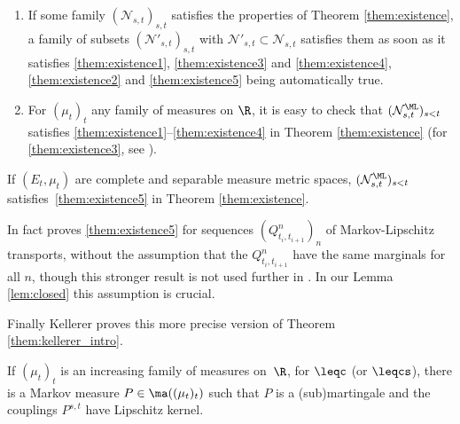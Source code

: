 \skpt
\begin{rem}\label{rem:otherNs}
\begin{enumerate}
\item\label{rem:otherNsa}
\label{item:rem:otherNsA} If some family $(\mathcal{N}_{s,t})_{s,t}$ satisfies the properties of Theorem \ref{them:existence}, a family of subsets $(\mathcal{N}'_{s,t})_{s,t}$ with $\mathcal{N}'_{s,t}\subset \mathcal{N}_{s,t}$ satisfies them as soon as it satisfies \eqref{them:existence1}, \eqref{them:existence3} and \eqref{them:existence4}, \eqref{them:existence2} and \eqref{them:existence5} being automatically true.

\item\label{rem:otherNsb}
\label{item:rem:otherNsB} For $(\mu_t)_t$ any family of measures on $\R$, it is easy to check that $(\mathcal{N}^\ML_{s,t})_{s<t}$ satisfies \eqref{them:existence1}--\eqref{them:existence4} in Theorem \ref{them:existence} (for \eqref{them:existence3}, see \cite[Satz 13]{Ke72}).
\end{enumerate}
\end{rem}

\begin{lem}\label{lem:lipschtz_implique_cinq}
If $(E_t,\mu_t)$ are complete and separable measure metric spaces, $(\mathcal{N}^\ML_{s,t})_{s<t}$ satisfies~\eqref{them:existence5} in Theorem \ref{them:existence}.
\end{lem}

\begin{rem}In fact \cite[Sätze 14 \& 15]{Ke72} proves \eqref{them:existence5} for sequences $(Q_{t_i,t_{i+1}}^n)_n$ of Markov-Lipschitz transports, without the assumption that the $Q_{t_i,t_{i+1}}^n$ have the same marginals for all $n$, though this stronger result is not used further in \cite{Ke72}. In our Lemma \ref{lem:closed} this assumption is crucial.
\end{rem}

Finally Kellerer proves this more precise version of Theorem \ref{them:kellerer_intro}.

\begin{them}\label{them:kellerer_final} If $(\mu_t)_t$ is an increasing family of measures on~$\R$, for $\leqc$ (or $\leqcs$), there is a Markov measure $P\in\ma((\mu_t)_t)$ such that $P$ is a (sub)martingale and the couplings $P^{s,t}$ have Lipschitz kernel.
\end{them}

